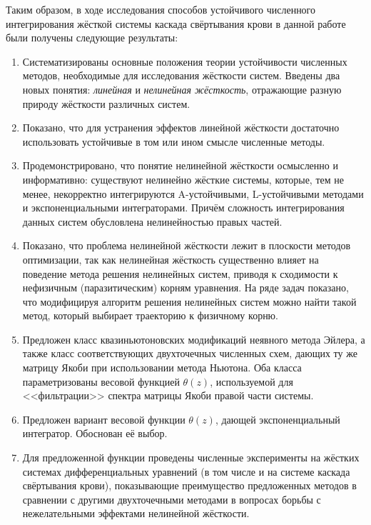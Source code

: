 Таким образом, в ходе исследования способов устойчивого численного интегрирования жёсткой системы каскада свёртывания крови
в данной работе были получены следующие результаты:
\begin{enumerate}
    \item
        Систематизированы основные положения теории устойчивости численных методов,
        необходимые для исследования жёсткости систем.
        Введены два новых понятия: \emph{линейная} и \emph{нелинейная жёсткость},
        отражающие разную природу жёсткости различных систем.
    \item
        Показано, что для устранения эффектов линейной жёсткости достаточно использовать
        устойчивые в том или ином смысле численные методы.
    \item
        Продемонстрировано, что понятие нелинейной жёсткости осмысленно и информативно:
        существуют нелинейно жёсткие системы, которые, тем не менее,
        некорректно интегрируются A-устойчивыми, L-устойчивыми методами и экспоненциальными интеграторами.
        Причём сложность интегрирования данных систем обусловлена нелинейностью правых частей.
    \item
        Показано, что проблема нелинейной жёсткости лежит в плоскости методов оптимизации,
        так как нелинейная жёсткость
        существенно влияет на поведение метода решения нелинейных систем,
        приводя к сходимости к нефизичным (паразитическим) корням уравнения.
        На ряде задач показано,
        что модифицируя алгоритм решения нелинейных систем можно найти такой метод,
        который выбирает траекторию к физичному корню.
    \item
        Предложен класс квазиньютоновских модификаций неявного метода Эйлера,
        а также класс соответствующих двухточечных численных схем,
        дающих ту же матрицу Якоби при использовании метода Ньютона.
        Оба класса параметризованы весовой функцией $ \theta(z) $,
        используемой для <<фильтрации>> спектра матрицы Якоби правой части системы.
    \item
        Предложен вариант весовой функции $ \theta(z) $,
        дающей экспоненциальный интегратор.
        Обоснован её выбор.
    \item
        Для предложенной функции проведены численные эксперименты на жёстких системах
        дифференциальных уравнений (в том числе и на системе каскада свёртывания крови),
        показывающие преимущество предложенных методов в сравнении с другими двухточечными методами
        в вопросах борьбы с нежелательными эффектами нелинейной жёсткости.
\end{enumerate}

